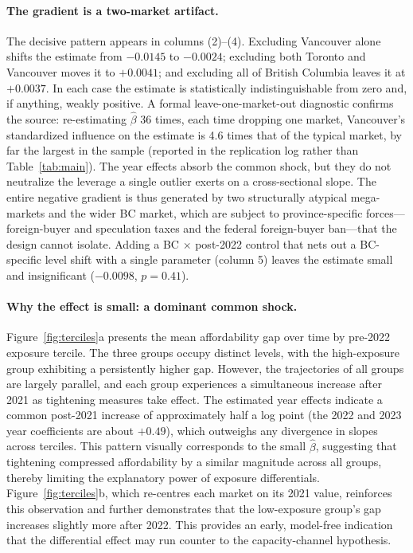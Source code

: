 \documentclass[12pt]{article}
\begin{document}
\paragraph{The gradient is a two-market artifact.} The decisive pattern appears in columns (2)--(4). Excluding Vancouver alone shifts the estimate from $-0.0145$ to $-0.0024$; excluding both Toronto and Vancouver moves it to $+0.0041$; and excluding all of British Columbia leaves it at $+0.0037$. In each case the estimate is statistically indistinguishable from zero and, if anything, weakly positive. A formal leave-one-market-out diagnostic confirms the source: re-estimating $\hat{\beta}$ 36 times, each time dropping one market, Vancouver's standardized influence on the estimate is 4.6 times that of the typical market, by far the largest in the sample (reported in the replication log rather than Table~\ref{tab:main}). The year effects absorb the common shock, but they do not neutralize the leverage a single outlier exerts on a cross-sectional slope. The entire negative gradient is thus generated by two structurally atypical mega-markets and the wider BC market, which are subject to province-specific forces---foreign-buyer and speculation taxes and the federal foreign-buyer ban---that the design cannot isolate. Adding a BC $\times$ post-2022 control that nets out a BC-specific level shift with a single parameter (column 5) leaves the estimate small and insignificant ($-0.0098$, $p=0.41$).

\paragraph{Why the effect is small: a dominant common shock.} Figure~\ref{fig:terciles}a presents the mean affordability gap over time by pre-2022 exposure tercile. The three groups occupy distinct levels, with the high-exposure group exhibiting a persistently higher gap. However, the trajectories of all groups are largely parallel, and each group experiences a simultaneous increase after 2021 as tightening measures take effect. The estimated year effects indicate a common post-2021 increase of approximately half a log point (the 2022 and 2023 year coefficients are about $+0.49$), which outweighs any divergence in slopes across terciles. This pattern visually corresponds to the small $\hat{\beta}$, suggesting that tightening compressed affordability by a similar magnitude across all groups, thereby limiting the explanatory power of exposure differentials. Figure~\ref{fig:terciles}b, which re-centres each market on its 2021 value, reinforces this observation and further demonstrates that the low-exposure group's gap increases slightly more after 2022. This provides an early, model-free indication that the differential effect may run counter to the capacity-channel hypothesis.
\end{document}
